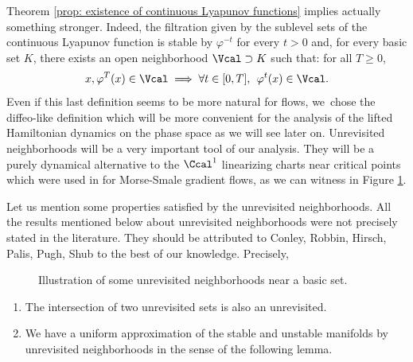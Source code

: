 \begin{remark}Theorem \ref{prop: existence of continuous Lyapunov functions} implies actually something stronger. Indeed, the filtration given by the sublevel sets of the continuous Lyapunov function is stable by $\varphi^{-t}$ for every $t > 0$ and, for every basic set $K$, there exists an open neighborhood $\Vcal \supset K$ such that: for all $T \geq 0$,
\[
x, \varphi^T (x) \in \Vcal \implies \forall t \in [0,T], \: \: \varphi^t (x) \in \Vcal.
\]
Even if this last definition seems to be more natural for flows, we~chose the diffeo-like definition which will be more convenient for the analysis of the lifted Hamiltonian dynamics on the phase space as we will see later on. Unrevisited neighborhoods will be a very important tool of our analysis. They will be a purely dynamical alternative to the $\Ccal^1$ linearizing charts near critical points which were used in \cite{DR0} for Morse-Smale gradient flows, as we can witness in Figure \ref{fig: unrevisited neighborhoods near a basic set}.
\end{remark}

Let us mention some properties satisfied by the unrevisited neighborhoods. All the results mentioned below about unrevisited neighborhoods were not precisely stated in the literature. They should be attributed to Conley, Robbin, Hirsch, Palis, Pugh, Shub to the best of our knowledge. Precisely,

\begin{figure}[!t]
\centering
\def\svgscale{0.7}

\caption{Illustration of some unrevisited neighborhoods near a basic set.}
\label{fig: unrevisited neighborhoods near a basic set}
\end{figure}

\begin{enumerate}\renewcommand{\theenumi}{{P\arabic{enumi}}}
\item\label{P1}
The intersection of two unrevisited sets is also an unrevisited.
\item\label{P2}
We have a uniform approximation of the stable and unstable manifolds by unrevisited neighborhoods in the sense of the following lemma.
\end{enumerate}

